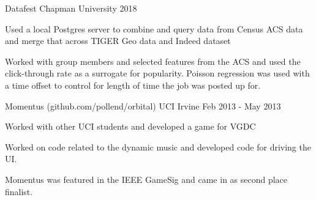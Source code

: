 \begin{cventries}
    
    
    
    
    {Datafest}
    {Chapman University}
    {2018}
    {
    \begin{cvitems} %
        \item {Used a local Postgres server to combine and query data from Census ACS data and merge that across TIGER Geo data and Indeed dataset}
        \item{Worked with group members and selected features from the ACS and used the click-through rate as a surrogate for popularity. Poisson regression was used with a time offset to control for length of time the job was posted up for.}
      \end{cvitems}
    }
    
    {Momentus ({\tiny github.com/pollend/orbital})} %
    {UCI Irvine} %
    {Feb 2013 - May 2013} %
    {
      \begin{cvitems} %
        \item{Worked with other UCI students and developed a game for VGDC}
        \item{Worked on code related to the dynamic music and developed code for driving the UI.}
        \item{Momentus was featured in the IEEE GameSig and came in as second place finalist.}
      \end{cvitems}
    }
\end{cventries}
